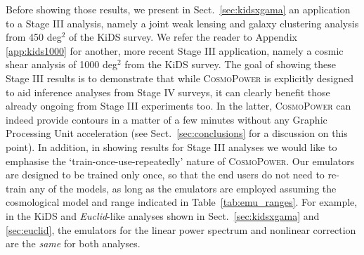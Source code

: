 \documentclass[fleqn,usenatbib]{mnras}
\begin{document}
Before showing those results, we present in Sect.~\ref{sec:kidsxgama} an application to a Stage III analysis, namely a joint weak lensing and galaxy clustering analysis from 450 deg$^2$ of the KiDS survey. We refer the reader to Appendix \ref{app:kids1000} for another, more recent Stage III application, namely a cosmic shear analysis of 1000 deg$^2$ from the KiDS survey. The goal of showing these Stage III results is to demonstrate that while \textsc{CosmoPower} is explicitly designed to aid inference analyses from Stage IV surveys, it can clearly benefit those already ongoing from Stage III experiments too. In the latter, \textsc{CosmoPower} can indeed provide contours in a matter of a few minutes without any Graphic Processing Unit acceleration (see Sect.~\ref{sec:conclusions} for a discussion on this point). In addition, in showing results for Stage III analyses we would like to emphasise the `train-once-use-repeatedly' nature of \textsc{CosmoPower}. Our emulators are designed to be trained only once, so that the end users do not need to re-train any of the models, as long as the emulators are employed assuming the cosmological model and range indicated in Table~\ref{tab:emu_ranges}. For example, in the KiDS and \textit{Euclid}-like analyses shown in Sect.~\ref{sec:kidsxgama} and \ref{sec:euclid}, the emulators for the linear power spectrum and nonlinear correction are the \textit{same} for both analyses. 
\end{document}
